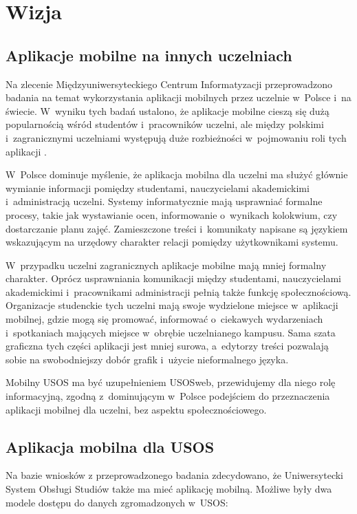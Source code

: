 \documentclass{pracamgr}
\begin{document}
\chapter{Wizja}
\label{sec:wizja}

\section{Aplikacje mobilne na innych uczelniach}

Na zlecenie Międzyuniwersyteckiego Centrum Informatyzacji \cite{muci} przeprowadzono
badania na temat wykorzystania aplikacji mobilnych przez uczelnie w~Polsce i~na świecie. W~wyniku tych badań ustalono, że aplikacje mobilne
cieszą się dużą popularnością wśród studentów i~pracowników uczelni, ale
między polskimi i~zagranicznymi uczelniami występują duże rozbieżności w~pojmowaniu
roli tych aplikacji \cite{przegladaplikacji}.

W~Polsce dominuje myślenie, że aplikacja mobilna dla uczelni ma służyć głównie
wymianie informacji pomiędzy studentami, nauczycielami akademickimi i~administracją
uczelni. Systemy informatycznie mają usprawniać formalne procesy, takie jak
wystawianie ocen, informowanie o~wynikach kolokwium, czy dostarczanie 
planu zajęć. Zamieszczone treści i~komunikaty napisane są językiem wskazującym na
urzędowy charakter relacji pomiędzy użytkownikami systemu.

W~przypadku uczelni zagranicznych aplikacje mobilne mają mniej formalny
charakter. Oprócz usprawniania komunikacji między studentami, nauczycielami
akademickimi i~pracownikami administracji pełnią także funkcję społecznościową.
Organizacje studenckie tych uczelni mają swoje wydzielone miejsce w~aplikacji
mobilnej, gdzie mogą się promować, informować o~ciekawych wydarzeniach i~spotkaniach
mających miejsce w~obrębie uczelnianego kampusu. Sama szata graficzna tych części
aplikacji jest mniej surowa, a~edytorzy treści pozwalają sobie na
swobodniejszy dobór grafik i~użycie nieformalnego języka. 

Mobilny USOS ma być uzupełnieniem USOSweb, przewidujemy dla niego rolę informacyjną,
zgodną z~dominującym w~Polsce podejściem do przeznaczenia aplikacji mobilnej dla uczelni,
bez aspektu społecznościowego.

\section{Aplikacja mobilna dla USOS}

Na bazie wniosków z przeprowadzonego badania zdecydowano, że Uniwersytecki
System Obsługi Studiów także ma mieć aplikację mobilną. Możliwe były dwa
modele dostępu do danych zgromadzonych w~USOS:
\end{document}
